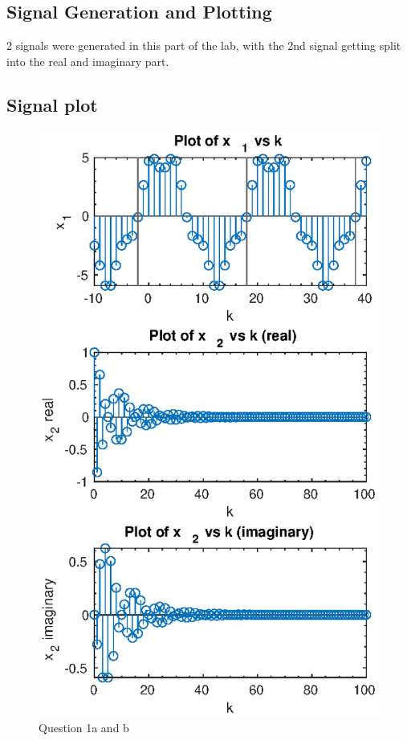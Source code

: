 \documentclass{article}
\begin{document}
\begin{multicols*}{2}
     \section{Signal Generation and Plotting}
     2 signals were generated in this part of the lab, with the 2nd signal getting split into the real and imaginary part.
     \subsection{Signal plot}
     \begin{figure}[H]
          \centering
          \includegraphics[width=\linewidth]{siggenres}
          \caption{Question 1a and b}
     \end{figure}

\end{multicols*}
\end{document}
